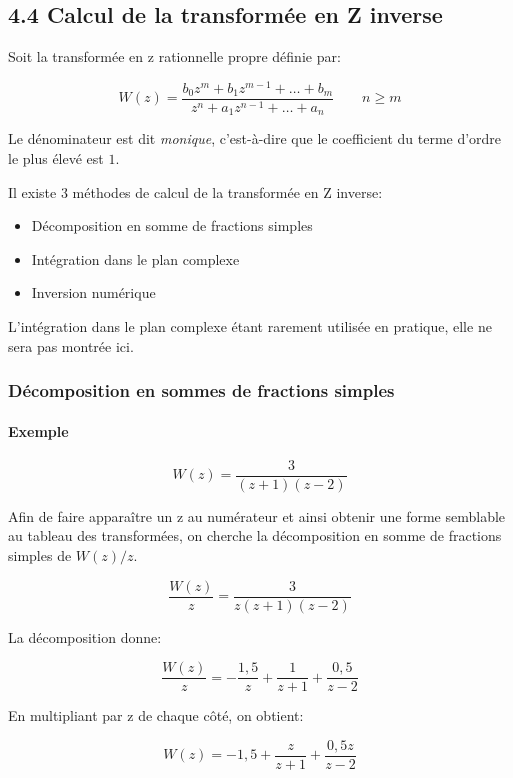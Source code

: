 \documentclass[11pt]{article}
\providecommand{\tightlist}{%
      \setlength{\itemsep}{0pt}\setlength{\parskip}{0pt}}
\begin{document}
    \subsection{4.4 Calcul de la transformée en Z
inverse}\label{calcul-de-la-transformuxe9e-en-z-inverse}

    Soit la transformée en z rationnelle propre définie par:

\[ W(z) = \frac{b_0z^m+b_1z^{m-1}+\dots+b_m}{z^n+a_1z^{n-1}+\dots+a_n} \qquad n \geq m \]

Le dénominateur est dit \emph{monique}, c'est-à-dire que le coefficient
du terme d'ordre le plus élevé est \(1\).

    Il existe 3 méthodes de calcul de la transformée en Z inverse:

\begin{itemize}
\tightlist
\item
  Décomposition en somme de fractions simples
\item
  Intégration dans le plan complexe
\item
  Inversion numérique
\end{itemize}

L'intégration dans le plan complexe étant rarement utilisée en pratique,
elle ne sera pas montrée ici.

    \subsubsection{Décomposition en sommes de fractions
simples}\label{duxe9composition-en-sommes-de-fractions-simples}

    \paragraph{Exemple}\label{exemple}

\[ W(z) = \frac{3}{(z+1)(z-2)} \]

Afin de faire apparaître un z au numérateur et ainsi obtenir une forme
semblable au tableau des transformées, on cherche la décomposition en
somme de fractions simples de \(W(z)/z\).

\[ \frac{W(z)}{z} = \frac{3}{z(z+1)(z-2)} \]

La décomposition donne:

\[ \frac{W(z)}{z} = -\frac{1,5}{z}+\frac{1}{z+1}+\frac{0,5}{z-2} \]

En multipliant par z de chaque côté, on obtient:

\[ W(z) = -1,5+\frac{z}{z+1}+\frac{0,5z}{z-2} \]
\end{document}
